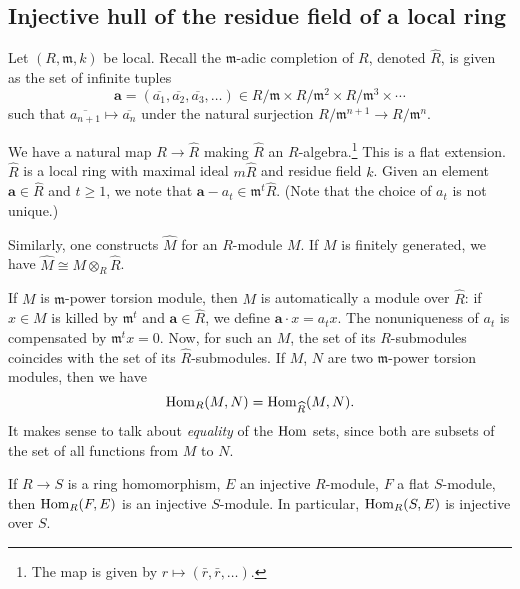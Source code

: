 \documentclass[12pt]{article}
\begin{document}
\subsection{Injective hull of the residue field of a local ring}

Let $(R, \mathfrak{m}, k)$ be local. Recall the $\mathfrak{m}$-adic completion of $R$, denoted $\widehat{R}$, is given as the set of infinite tuples
\begin{equation*} 
	\mathbf{a} = (\overline{a_{1}}, \overline{a_{2}}, \overline{a_{3}}, \ldots) \in R/\mathfrak{m} \times R/\mathfrak{m}^{2} \times R/\mathfrak{m}^{3} \times \cdots
\end{equation*}
such that $\overline{a_{n + 1}} \mapsto \overline{a_{n}}$ under the natural surjection $R/\mathfrak{m}^{n + 1} \to R/\mathfrak{m}^{n}$.

We have a natural map $R \to \widehat{R}$ making $\widehat{R}$ an $R$-algebra.\footnote{The map is given by $r \mapsto (\bar{r}, \bar{r}, \ldots)$.} This is a flat extension. $\widehat{R}$ is a local ring with maximal ideal $m \widehat{R}$ and residue field $k$. \newline
Given an element $\mathbf{a} \in \widehat{R}$ and $t \ge 1$, we note that $\mathbf{a} - a_{t} \in \mathfrak{m}^{t} \widehat{R}$. (Note that the choice of $a_{t}$ is not unique.)

Similarly, one constructs $\widehat{M}$ for an $R$-module $M$. If $M$ is finitely generated, we have $\widehat{M} \cong M \otimes_{R} \widehat{R}$. 

If $M$ is $\mathfrak{m}$-power torsion module, then $M$ is automatically a module over $\widehat{R}$: if $x \in M$ is killed by $\mathfrak{m}^{t}$ and $\mathbf{a} \in \widehat{R}$, we define $\mathbf{a} \cdot x = a_{t} x$. The nonuniqueness of $a_{t}$ is compensated by $\mathfrak{m}^{t} x = 0$.\newline
Now, for such an $M$, the set of its $R$-submodules coincides with the set of its $\widehat{R}$-submodules. If $M$, $N$ are two $\mathfrak{m}$-power torsion modules, then we have
\begin{equation*} 
	\operatorname{Hom}_{R}(M, N) = \operatorname{Hom}_{\widehat{R}}(M, N).
\end{equation*}
It makes sense to talk about \emph{equality} of the $\operatorname{Hom}$ sets, since both are subsets of the set of all functions from $M$ to $N$.

\begin{lem} 
	If $R \to S$ is a ring homomorphism, $E$ an injective $R$-module, $F$ a flat $S$-module, then $\operatorname{Hom}_{R}(F, E)$ is an injective $S$-module. \newline
	In particular, $\operatorname{Hom}_{R}(S, E)$ is injective over $S$.
\end{lem}
\end{document}
